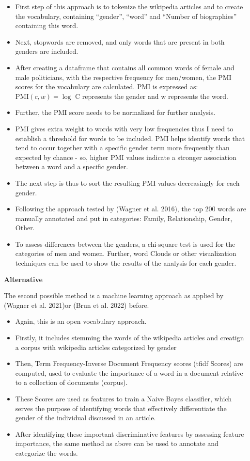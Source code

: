 \documentclass[
]{article}
\providecommand{\tightlist}{%
  \setlength{\itemsep}{0pt}\setlength{\parskip}{0pt}}
\begin{document}
\begin{itemize}
\tightlist
\item
  First step of this approach is to tokenize the wikipedia articles and
  to create the vocabulary, containing ``gender'', ``word'' and ``Number
  of biographies'' containing this word.
\item
  Next, stopwords are removed, and only words that are present in both
  genders are included.
\item
  After creating a dataframe that contains all common words of female
  and male politicians, with the respective frequency for men/women, the
  PMI scores for the vocabulary are calculated. PMI is expressed as:
  \(\text{PMI}(c, w) = \log\) C represents the gender and w represents
  the word.
\item
  Further, the PMI score needs to be normalized for further analysis.
\item
  PMI gives extra weight to words with very low frequencies thus I need
  to establish a threshold for words to be included. PMI helps identify
  words that tend to occur together with a specific gender term more
  frequently than expected by chance - so, higher PMI values indicate a
  stronger association between a word and a specific gender.
\item
  The next step is thus to sort the resulting PMI values decreasingly
  for each gender.
\item
  Following the approach tested by (Wagner et al. 2016), the top 200
  words are manually annotated and put in categories: Family,
  Relationship, Gender, Other.
\item
  To assess differences between the genders, a chi-square test is used
  for the categories of men and women. Further, word Clouds or other
  visualization techniques can be used to show the results of the
  analysis for each gender.
\end{itemize}

\textbf{Alternative}

The second possible method is a machine learning approach as applied by
(Wagner et al. 2021)or (Brun et al. 2022) before.

\begin{itemize}
\tightlist
\item
  Again, this is an open vocabulary approach.
\item
  Firstly, it includes stemming the words of the wikipedia articles and
  creatign a corpus with wikipedia articles categorized by gender
\item
  Then, Term Frequency-Inverse Document Frequency scores (tfidf Scores)
  are computed, used to evaluate the importance of a word in a document
  relative to a collection of documents (corpus).
\item
  These Scores are used as features to train a Naive Bayes classifier,
  which serves the purpose of identifying words that effectively
  differentiate the gender of the individual discussed in an article.
\item
  After identifying these important discriminative features by assessing
  feature importance, the same method as above can be used to annotate
  and categorize the words.
\end{itemize}
\end{document}
